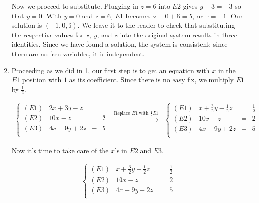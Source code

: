 \begin{ex}
\begin{enumerate}
Now we proceed to substitute.  Plugging in $z=6$ into $E2$ gives $y - 3 = -3$ so that $y = 0$.  With $y=0$ and $z=6$, $E1$ becomes $x - 0 + 6 = 5$, or $x = -1$.  Our solution is $(-1,0,6)$.  We leave it to the reader to check that substituting the respective values for $x$, $y$, and $z$ into the original system results in three identities.  Since we have found a solution, the system is consistent;  since there are no free variables, it is independent.

\item  Proceeding as we did in 1, our first step is to get an equation with $x$ in the $E1$ position with $1$ as its coefficient.  Since there is no easy fix, we multiply $E1$ by $\frac{1}{2}$.


\[\begin{array}{ccc}

\left\{ 

\begin{array}{lrcr}

(E1) & 2x+3y-z & = & 1 \\ 
(E2) & 10x-z & = & 2 \\
(E3) &  4x-9y+2z & = & 5 \\

\end{array} 

\right.

&
\xrightarrow{\text{Replace $E1$ with $\frac{1}{2}E1$}}

&

\left\{ 

\begin{array}{lrcr}

(E1) & x+\frac{3}{2}y-\frac{1}{2}z & = & \frac{1}{2} \\ 
(E2) & 10x-z & = & 2 \\
(E3) &  4x-9y+2z & = & 5 \\

\end{array} 

\right.
\end{array}\]

Now it's time to take care of the $x$'s in $E2$ and $E3$.

\[ \begin{array}{ccc}

\left\{ 

\begin{array}{lrcr}

(E1) & x+\frac{3}{2}y-\frac{1}{2}z & = & \frac{1}{2} \\ 
(E2) & 10x-z & = & 2 \\
(E3) &  4x-9y+2z & = & 5 \\


\end{array}
\end{array}\]
\end{enumerate}
\end{ex}
